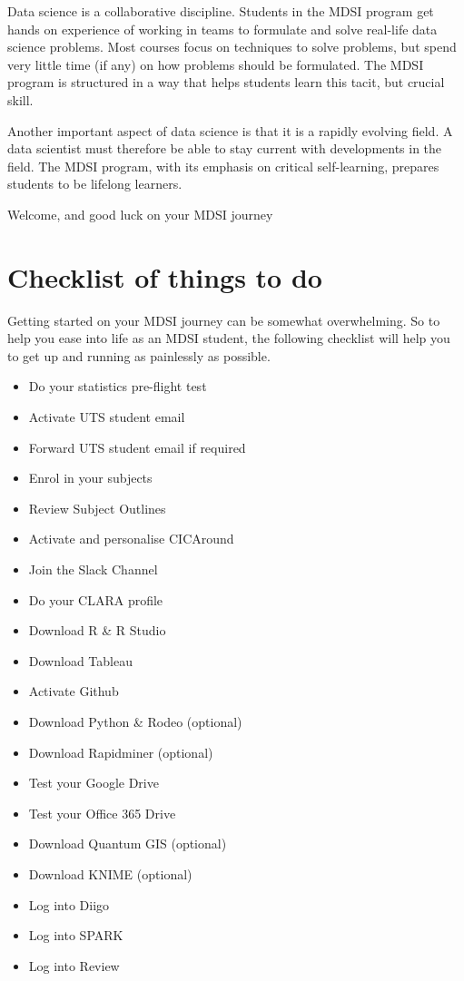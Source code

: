 \documentclass[]{book}
\providecommand{\tightlist}{%
  \setlength{\itemsep}{0pt}\setlength{\parskip}{0pt}}
\theoremstyle{definition}
\theoremstyle{definition}
\theoremstyle{remark}
\begin{document}
Data science is a collaborative discipline. Students in the MDSI program
get hands on experience of working in teams to formulate and solve
real-life data science problems. Most courses focus on techniques to
solve problems, but spend very little time (if any) on how problems
should be formulated. The MDSI program is structured in a way that helps
students learn this tacit, but crucial skill.

Another important aspect of data science is that it is a rapidly
evolving field. A data scientist must therefore be able to stay current
with developments in the field. The MDSI program, with its emphasis on
critical self-learning, prepares students to be lifelong learners.

Welcome, and good luck on your MDSI journey

\section{Checklist of things to do}\label{checklist-of-things-to-do}

Getting started on your MDSI journey can be somewhat overwhelming. So to
help you ease into life as an MDSI student, the following checklist will
help you to get up and running as painlessly as possible.

\begin{itemize}
\tightlist
\item
  Do your statistics pre-flight test
\item
  Activate UTS student email
\item
  Forward UTS student email if required
\item
  Enrol in your subjects
\item
  Review Subject Outlines
\item
  Activate and personalise CICAround
\item
  Join the Slack Channel
\item
  Do your CLARA profile
\item
  Download R \& R Studio
\item
  Download Tableau
\item
  Activate Github
\item
  Download Python \& Rodeo (optional)
\item
  Download Rapidminer (optional)
\item
  Test your Google Drive
\item
  Test your Office 365 Drive
\item
  Download Quantum GIS (optional)
\item
  Download KNIME (optional)
\item
  Log into Diigo
\item
  Log into SPARK
\item
  Log into Review
\end{itemize}
\end{document}
